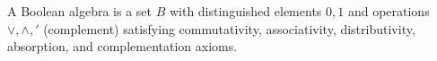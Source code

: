 A Boolean algebra is a set $B$ with distinguished elements $0, 1$ and operations $\lor, \land, '$ (complement) satisfying commutativity, associativity, distributivity, absorption, and complementation axioms.

